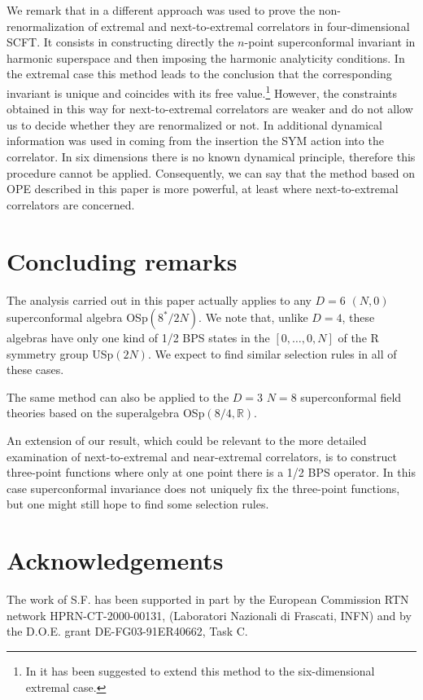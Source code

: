 \documentclass[a4paper,11pt]{article}
\begin{document}
We remark that in \cite{DHoFrMaMaRa1} a different approach was used
to prove the non-renormalization of extremal and next-to-extremal correlators
in four-dimensional SCFT. It consists in constructing directly the $n$-point
superconformal invariant in harmonic superspace and then imposing the harmonic
analyticity conditions. In the extremal case this method leads to the
conclusion that the corresponding invariant is unique and coincides with its
free value.\footnote{In \cite{Htensor} it has been suggested to extend this
method to the six-dimensional extremal case.} However, the constraints obtained
in this way for next-to-extremal correlators are weaker and do not allow us to
decide whether they are renormalized or not. In \cite{DHoFrMaMaRa1} additional
dynamical information was used in coming from the insertion the SYM action into
the correlator. In six dimensions there is no known dynamical principle,
therefore this procedure cannot be applied. Consequently, we can say that the
method based on OPE described in this paper is more powerful, at least where
next-to-extremal correlators are concerned.


\section*{Concluding remarks}
The analysis carried out in this paper actually applies to any $D=6$ $(N,0)$
superconformal algebra OSp$(8^{*}/2N)$. We note that, unlike $D=4$, these
algebras have only one kind of 1/2 BPS states in the $[0,\ldots,0,N]$ of the
R symmetry group USp$(2N)$. We expect to find similar selection rules in all of
these cases.

The same method can also be applied to the $D=3$ $N=8$ superconformal field
theories based on the superalgebra OSp$(8/4,\mathbb{R})$.

An extension of our result, which could be relevant to the more detailed
examination of next-to-extremal and near-extremal correlators, is to construct
three-point functions where only at one point there is a 1/2 BPS operator.
In this case superconformal invariance does not uniquely fix the three-point
functions, but one might still hope to find some selection rules.


\section*{Acknowledgements}
The work of S.F. has been supported in part by the European Commission RTN
network HPRN-CT-2000-00131, (Laboratori Nazionali di Frascati, INFN) and by the
D.O.E. grant DE-FG03-91ER40662, Task C.
\end{document}
